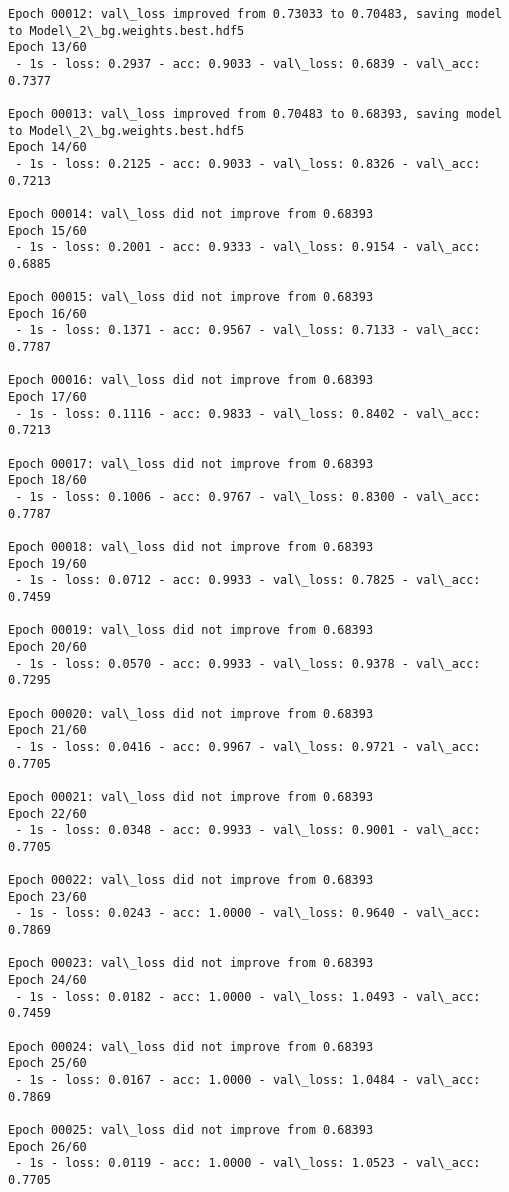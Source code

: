 \documentclass[11pt]{article}
\begin{document}
\begin{Verbatim}[commandchars=\\\{\}]
Epoch 00012: val\_loss improved from 0.73033 to 0.70483, saving model to Model\_2\_bg.weights.best.hdf5
Epoch 13/60
 - 1s - loss: 0.2937 - acc: 0.9033 - val\_loss: 0.6839 - val\_acc: 0.7377

Epoch 00013: val\_loss improved from 0.70483 to 0.68393, saving model to Model\_2\_bg.weights.best.hdf5
Epoch 14/60
 - 1s - loss: 0.2125 - acc: 0.9033 - val\_loss: 0.8326 - val\_acc: 0.7213

Epoch 00014: val\_loss did not improve from 0.68393
Epoch 15/60
 - 1s - loss: 0.2001 - acc: 0.9333 - val\_loss: 0.9154 - val\_acc: 0.6885

Epoch 00015: val\_loss did not improve from 0.68393
Epoch 16/60
 - 1s - loss: 0.1371 - acc: 0.9567 - val\_loss: 0.7133 - val\_acc: 0.7787

Epoch 00016: val\_loss did not improve from 0.68393
Epoch 17/60
 - 1s - loss: 0.1116 - acc: 0.9833 - val\_loss: 0.8402 - val\_acc: 0.7213

Epoch 00017: val\_loss did not improve from 0.68393
Epoch 18/60
 - 1s - loss: 0.1006 - acc: 0.9767 - val\_loss: 0.8300 - val\_acc: 0.7787

Epoch 00018: val\_loss did not improve from 0.68393
Epoch 19/60
 - 1s - loss: 0.0712 - acc: 0.9933 - val\_loss: 0.7825 - val\_acc: 0.7459

Epoch 00019: val\_loss did not improve from 0.68393
Epoch 20/60
 - 1s - loss: 0.0570 - acc: 0.9933 - val\_loss: 0.9378 - val\_acc: 0.7295

Epoch 00020: val\_loss did not improve from 0.68393
Epoch 21/60
 - 1s - loss: 0.0416 - acc: 0.9967 - val\_loss: 0.9721 - val\_acc: 0.7705

Epoch 00021: val\_loss did not improve from 0.68393
Epoch 22/60
 - 1s - loss: 0.0348 - acc: 0.9933 - val\_loss: 0.9001 - val\_acc: 0.7705

Epoch 00022: val\_loss did not improve from 0.68393
Epoch 23/60
 - 1s - loss: 0.0243 - acc: 1.0000 - val\_loss: 0.9640 - val\_acc: 0.7869

Epoch 00023: val\_loss did not improve from 0.68393
Epoch 24/60
 - 1s - loss: 0.0182 - acc: 1.0000 - val\_loss: 1.0493 - val\_acc: 0.7459

Epoch 00024: val\_loss did not improve from 0.68393
Epoch 25/60
 - 1s - loss: 0.0167 - acc: 1.0000 - val\_loss: 1.0484 - val\_acc: 0.7869

Epoch 00025: val\_loss did not improve from 0.68393
Epoch 26/60
 - 1s - loss: 0.0119 - acc: 1.0000 - val\_loss: 1.0523 - val\_acc: 0.7705


\end{Verbatim}
\end{document}

